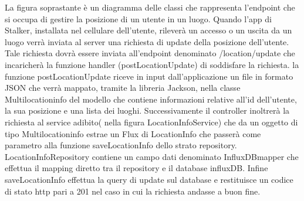 \documentclass[../manuale-manutentore.tex]{subfiles}
\begin{document}
  La figura soprastante è un diagramma delle classi che rappresenta l'endpoint che si occupa di gestire la posizione di un utente in un luogo.
  Quando l'app di Stalker, installata nel cellulare dell'utente, rileverà un accesso o un uscita da un luogo verrà inviata al server una richiesta di update della posizione dell'utente.
  Tale richiesta dovrà essere inviata all'endpoint denominato /location/update che incaricherà la funzione handler (postLocationUpdate) di soddisfare la richiesta.
  la funzione postLocationUpdate riceve in input dall'applicazione un file in formato JSON che verrà mappato, tramite la libreria Jackson, nella classe Multilocationinfo del modello che contiene informazioni relative all'id dell'utente, la sua posizione e una lista dei luoghi.
  Successivamente il controller inoltrerà la richiesta al service adibito( nella figura LocationInfoService) che da un oggetto di tipo Multilocationinfo estrae un Flux di LocationInfo che passerà come parametro alla funzione saveLocationInfo dello strato repository.
  LocationInfoRepository contiene un campo dati denominato InfluxDBmapper che effettua il mapping diretto tra il repository e il database influxDB. Infine saveLocationInfo effettua la query di update sul database e restituisce un codice di stato http pari a 201 nel caso in cui la richiesta andasse a buon fine.
\end{document}
